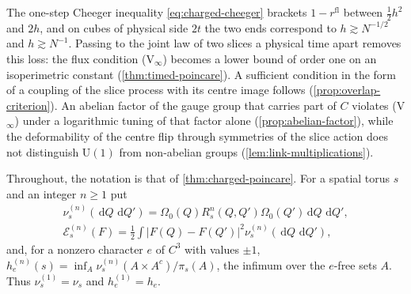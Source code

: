 \documentclass[11pt,a4paper]{amsart}
\theoremstyle{definition}
\theoremstyle{remark}
\numberwithin{equation}{section}
\newcommand{\abs}[1]{\lvert #1\rvert}      %
\newcommand{\dd}{\,\mathrm{d}}             %
\newcommand{\U}{\mathrm{U}}                %
\newcommand{\Omegazero}{\Omega_0}          %
\begin{document}
The one-step Cheeger inequality \eqref{eq:charged-cheeger} brackets $1-r^{\mathrm{fl}}$ between $\frac12h^2$ and $2h$, and on cubes of physical side $2t$ the two ends correspond to $h\gtrsim N^{-1/2}$ and $h\gtrsim N^{-1}$. Passing to the joint law of two slices a physical time apart removes this loss: the flux condition \textup{(V$_\infty$)} becomes a lower bound of order one on an isoperimetric constant (\cref{thm:timed-poincare}). A sufficient condition in the form of a coupling of the slice process with its centre image follows (\cref{prop:overlap-criterion}). An abelian factor of the gauge group that carries part of $C$ violates \textup{(V$_\infty$)} under a logarithmic tuning of that factor alone (\cref{prop:abelian-factor}), while the deformability of the centre flip through symmetries of the slice action does not distinguish $\U(1)$ from non-abelian groups (\cref{lem:link-multiplications}).

Throughout, the notation is that of \cref{thm:charged-poincare}. For a spatial torus $s$ and an integer $n\ge1$ put
\begin{gather*}
\nu^{(n)}_s(\dd Q\,\dd Q')=\Omegazero(Q)R_s^n(Q,Q')\Omegazero(Q')\dd Q\,\dd Q',\\
\mathcal E^{(n)}_s(F)=\tfrac12\int\abs{F(Q)-F(Q')}^2\nu^{(n)}_s(\dd Q\,\dd Q'),
\end{gather*}
and, for a nonzero character $e$ of $C^3$ with values $\pm1$, $h^{(n)}_e(s)=\inf_A\nu^{(n)}_s(A\times A^c)/\pi_s(A)$, the infimum over the $e$-free sets $A$. Thus $\nu^{(1)}_s=\nu_s$ and $h^{(1)}_e=h_e$.
\end{document}
